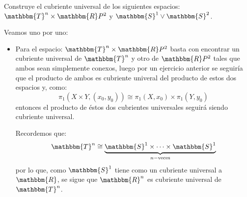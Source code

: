 \documentclass[12pt]{report}
\newcounter{it}
\theoremstyle{largebreak}
\newcommand{\bbm}[1]{\ensuremath{\mathbbm{#1}}}
\begin{document}
    \begin{excer}
        Construye el cubriente universal de los siguientes espacios: $\bbm{T}^n\times\bbm{R}P^2$ y $\bbm{S}^1\lor\bbm{S}^2$.
    \end{excer}

    \begin{sol}
        Veamos uno por uno:
        \begin{itemize}
            \item Para el espacio: $\bbm{T}^n\times\bbm{R}P^2$ basta con encontrar un cubriente universal de $\bbm{T}^n$ y otro de $\bbm{R}P^2$ tales que ambos sean simplemente conexos, luego por un ejercicio anterior se seguiría que el producto de ambos es cubriente univeral del producto de estos dos espacios y, como:
            \begin{equation*}
                \pi_1(X\times Y,(x_0,y_0))\cong\pi_1(X,x_0)\times\pi_1(Y,y_0)
            \end{equation*}
            entonces el producto de éstos dos cubrientes universales seguirá siendo cubriente universal.

            Recordemos que:
            \begin{equation*}
                \bbm{T}^n\cong\underset{n-\textup{veces}}{\underbrace{\bbm{S}^1\times\cdots\times\bbm{S}^1}}
            \end{equation*}
            por lo que, como $\bbm{S}^1$ tiene como un cubriente universal a $\bbm{R}$, se sigue que $\bbm{R}^n$ es cubriente universal de $\bbm{T}^n$.


\end{itemize}
\end{sol}
\end{document}
